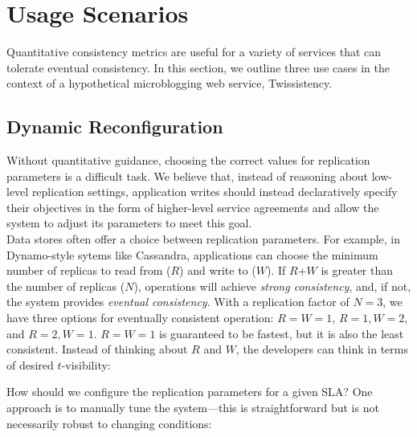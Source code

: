 \section{Usage Scenarios}
\label{sec:scenarios}

Quantitative consistency metrics are useful for a variety of services
that can tolerate eventual consistency. In this section, we outline
three use cases in the context of a hypothetical microblogging web
service, Twissistency.

\subsection{Dynamic Reconfiguration}
\label{sec:dynamic}

Without quantitative guidance, choosing the correct values for
replication parameters is a difficult task. We believe that, instead
of reasoning about low-level replication settings, application writes
should instead declaratively specify their objectives in the form of
higher-level service agreements and allow the system to adjust its
parameters to meet this goal.\\

Data stores often offer a choice between replication parameters. For
example, in Dynamo-style sytems like Cassandra, applications can
choose the minimum number of replicas to read from ($R$) and write to
($W$). If $R$+$W$ is greater than the number of replicas ($N$),
operations will achieve \textit{strong consistency}, and, if not, the
system provides \textit{eventual consistency}. With a replication
factor of $N=3$, we have three options for eventually consistent
operation: $R$$=$$W$$=$$1$, $R$$=$$1$$, W$$=$$2$, and $R$$=$$2$$,
W$$=$$1$.  $R$$=$$W$$=$$1$ is guaranteed to be fastest, but it is also
the least consistent. Instead of thinking about $R$ and $W$, the
developers can think in terms of desired $t$-visibility:


How should we configure the replication parameters for a given SLA?
One approach is to manually tune the system---this is straightforward
but is not necessarily robust to changing conditions:


